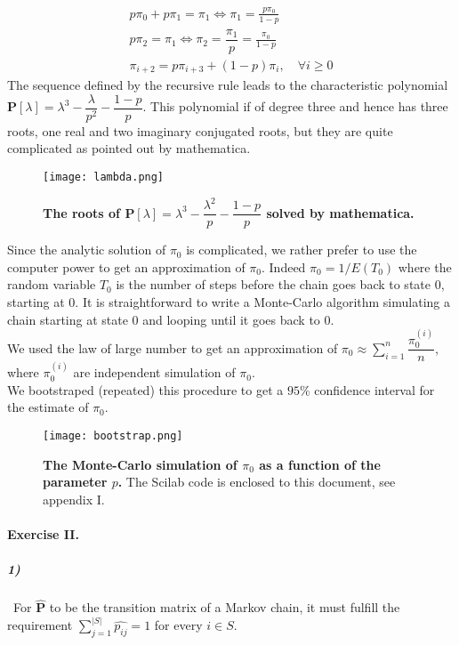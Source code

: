 \documentclass{article}
\begin{document}
\begin{gather*}
p \pi_0+ p \pi_1=\pi_1 \iff \pi_1=\frac{p \pi_0}{1-p} \\
p \pi_2=\pi_1 \iff \pi_2=\dfrac{\pi_1}{p}=\frac{\pi_0}{1-p}\\
\pi_{i+2}=p \pi_{i+3}+(1-p)\pi_{i}, \quad \forall i\geq 0
\end{gather*}
The sequence defined by the recursive rule leads to the characteristic polynomial $\pmb{P}[\lambda]=\lambda^3-\dfrac{\lambda}{p^2}-\dfrac{1-p}{p}$.
This polynomial if of degree three and hence has three roots, one real and two imaginary conjugated roots, but they are quite complicated as pointed out by mathematica.
\begin{figure}[H]
	  \centering
  	\texttt{[image: lambda.png]}
  	  	\caption{\textbf{The roots of $\pmb{P}[\lambda]=\lambda^3-\dfrac{\lambda^2}{p}-\dfrac{1-p}{p}$ solved by mathematica.}}
	\end{figure}

Since the analytic solution of $\pi_0$ is complicated, we rather prefer to use the computer power to get an approximation of $\pi_0$. Indeed $\pi_0 = 1/E(T_0)$ where the random variable $T_0$ is the number of steps before the chain goes back to state $0$, starting at $0$.
It is straightforward to write a Monte-Carlo algorithm simulating a chain starting at state $0$ and looping until it goes back to $0$. \\

We used the law of large number to get an approximation of $\displaystyle \pi_0 \approx \sum_{i=1}^n \dfrac{\pi_0^{(i)}}{n}$, where $\pi_0^{(i)}$ are independent simulation of $\pi_0$.\\

 We bootstraped (repeated) this procedure to get a $95\%$ confidence interval for the estimate of $\pi_0$.
\begin{figure}[H]
	  \centering
  	\texttt{[image: bootstrap.png]}
  	  	\caption{\textbf{The Monte-Carlo simulation of $\pi_0$ as a function of the parameter $p$.} The Scilab code is enclosed to this document, see appendix I.}
	\end{figure}











\paragraph{Exercise II.\\}
\subparagraph{1)}
\
For $\widehat{\pmb{P}}$ to be the transition matrix of a Markov chain, it must fulfill the requirement $\displaystyle \sum_{j=1}^{|S|} \widehat{p_{ij}} =1$ for every $i \in S$.
\end{document}
